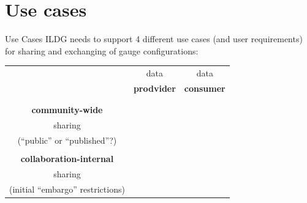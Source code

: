 \documentclass[aspectratio=169,xcolor=dvipsnames]{beamer}
\newcommand{\green}{\color{g3}}
\def\Dok{\ding{52}}
\begin{document}
\section{Use cases}
\begin{frame}{Use Cases}
  ILDG needs to support 4 different use cases
  (and user requirements) \\
  for sharing and exchanging of gauge configurations:

  \begin{center}
    \begin{tabular}{c||c|c}
      & data  &  data
      \\
      & \bf prodvider & \bf consumer
      \\
      &&\\ \hline \hline &&\\
      \bf community-wide & \green \Dok & \green \Dok 
      \\  sharing &&
      \\ (``public'' or ``published''?) &&
      \\ \hline && \\
      \bf collaboration-internal  & \green \Dok & \green \Dok 
      \\  sharing &&
      \\ (initial ``embargo'' restrictions) &&
    \end{tabular}
    \hspace*{20mm}
  \end{center}
  
\end{frame}
\end{document}
